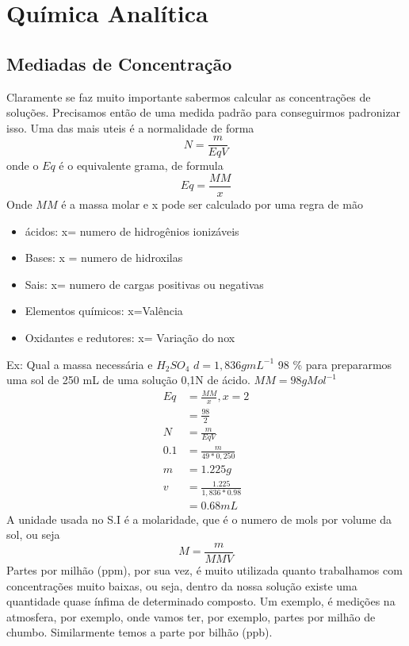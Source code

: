 \chapter{Química Analítica}
\section{Mediadas de Concentração}
Claramente se faz muito importante sabermos calcular as concentrações de soluções. Precisamos então
de uma medida padrão para conseguirmos padronizar isso. Uma das mais uteis é a normalidade de forma 
\begin{equation}
    N=\frac{m}{EqV}
\end{equation}
onde o \(Eq\) é o equivalente grama, de formula 
\begin{equation}
    Eq=\frac{MM}{x}
\end{equation}
Onde \(MM\) é a massa molar e x pode ser calculado por uma regra de mão
\begin{itemize}
    \item ácidos: x= numero de hidrogênios ionizáveis
    \item Bases: x = numero de hidroxilas
    \item Sais: x= numero de cargas positivas ou negativas
    \item Elementos químicos: x=Valência
    \item Oxidantes e redutores: x= Variação do nox
\end{itemize}
Ex: Qual a massa necessária e \(H_2SO_4\) \(d=1,836 gmL^{-1}\) 98 \% para prepararmos uma sol de 250
mL de uma solução 0,1N de ácido. \(MM=98g Mol^ {-1}\)
\begin{align}
    Eq&=\frac{MM}{x}, x=2\\
    &=\frac{98}{2}\\
    N&=\frac{m}{EqV}\\
    0.1&=\frac{m}{49*0,250}\\
    m&=1.225 g\\
    v&=\frac{1.225}{1,836*0.98}\\
    &=0.68 mL
\end{align}
A unidade usada no S.I é a molaridade, que é o numero de mols por volume da sol, ou seja
\begin{equation}
    M=\frac{m}{MM V}
\end{equation}
 Partes por milhão (ppm), por sua vez, é muito utilizada quanto trabalhamos com concentrações muito
 baixas, ou seja, dentro da nossa solução existe uma quantidade quase ínfima de determinado
 composto. Um exemplo, é medições na atmosfera, por exemplo, onde vamos ter, por exemplo, partes por
 milhão de chumbo. Similarmente temos a parte por bilhão (ppb).

